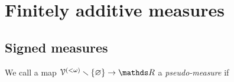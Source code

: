 \documentclass[scombinatorics.tex]{subfiles}
\begin{document}
\chapter{Finitely additive measures}
\label{sauer}



\def\medrel#1{\parbox[t]{5ex}{$\displaystyle\hfil #1$}}
\def\ceq#1#2#3{\parbox[t]{20ex}{$\displaystyle #1$}\medrel{#2}{$\displaystyle #3$}}


\section{Signed measures}\label{measures}

We call a map $\V^{(<\omega)}\sm\{\0\}\to\RR$ a \emph{pseudo-measure\/} if 
\end{document}
